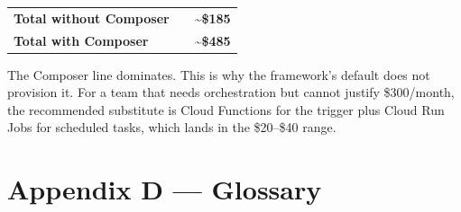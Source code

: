 \documentclass[
  11pt,
  british,
  oneside]{book}
\begin{document}
\begin{longtable}[]{@{}lll@{}}
\begin{minipage}[t]{0.30\columnwidth}
\textbf{Total without Composer}\strut
\end{minipage} & \begin{minipage}[t]{0.30\columnwidth}\raggedright
\strut
\end{minipage} & \begin{minipage}[t]{0.30\columnwidth}\raggedright
\textbf{\textasciitilde\$185}\strut
\end{minipage}\tabularnewline
\begin{minipage}[t]{0.30\columnwidth}\raggedright
\textbf{Total with Composer}\strut
\end{minipage} & \begin{minipage}[t]{0.30\columnwidth}\raggedright
\strut
\end{minipage} & \begin{minipage}[t]{0.30\columnwidth}\raggedright
\textbf{\textasciitilde\$485}\strut
\end{minipage}\tabularnewline
\bottomrule
\end{longtable}

The Composer line dominates. This is why the framework's default does
not provision it. For a team that needs orchestration but cannot justify
\$300/month, the recommended substitute is Cloud Functions for the
trigger plus Cloud Run Jobs for scheduled tasks, which lands in the
\$20--\$40 range.

\newpage

\hypertarget{appendix-d-glossary}{%
\chapter{Appendix D --- Glossary}\label{appendix-d-glossary}}
\end{document}
